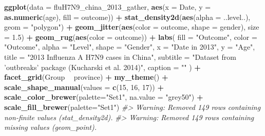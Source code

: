 \documentclass[]{book}
\newenvironment{Shaded}{\begin{snugshade}}{\end{snugshade}}
\newcommand{\CommentTok}[1]{\textcolor[rgb]{0.56,0.35,0.01}{\textit{#1}}}
\newcommand{\DataTypeTok}[1]{\textcolor[rgb]{0.13,0.29,0.53}{#1}}
\newcommand{\DecValTok}[1]{\textcolor[rgb]{0.00,0.00,0.81}{#1}}
\newcommand{\FloatTok}[1]{\textcolor[rgb]{0.00,0.00,0.81}{#1}}
\newcommand{\KeywordTok}[1]{\textcolor[rgb]{0.13,0.29,0.53}{\textbf{#1}}}
\newcommand{\NormalTok}[1]{#1}
\newcommand{\OperatorTok}[1]{\textcolor[rgb]{0.81,0.36,0.00}{\textbf{#1}}}
\newcommand{\StringTok}[1]{\textcolor[rgb]{0.31,0.60,0.02}{#1}}
\begin{document}
\begin{Shaded}
\begin{Highlighting}[]
\KeywordTok{ggplot}\NormalTok{(}\DataTypeTok{data =}\NormalTok{ fluH7N9_china_}\DecValTok{2013}\NormalTok{_gather, }
       \KeywordTok{aes}\NormalTok{(}\DataTypeTok{x =}\NormalTok{ Date, }\DataTypeTok{y =} \KeywordTok{as.numeric}\NormalTok{(age), }\DataTypeTok{fill =}\NormalTok{ outcome)) }\OperatorTok{+}
\StringTok{  }\KeywordTok{stat_density2d}\NormalTok{(}\KeywordTok{aes}\NormalTok{(}\DataTypeTok{alpha =}\NormalTok{ ..level..), }\DataTypeTok{geom =} \StringTok{"polygon"}\NormalTok{) }\OperatorTok{+}
\StringTok{  }\KeywordTok{geom_jitter}\NormalTok{(}\KeywordTok{aes}\NormalTok{(}\DataTypeTok{color =}\NormalTok{ outcome, }\DataTypeTok{shape =}\NormalTok{ gender), }\DataTypeTok{size =} \FloatTok{1.5}\NormalTok{) }\OperatorTok{+}
\StringTok{  }\KeywordTok{geom_rug}\NormalTok{(}\KeywordTok{aes}\NormalTok{(}\DataTypeTok{color =}\NormalTok{ outcome)) }\OperatorTok{+}
\StringTok{  }\KeywordTok{labs}\NormalTok{(}
    \DataTypeTok{fill =} \StringTok{"Outcome"}\NormalTok{,}
    \DataTypeTok{color =} \StringTok{"Outcome"}\NormalTok{,}
    \DataTypeTok{alpha =} \StringTok{"Level"}\NormalTok{,}
    \DataTypeTok{shape =} \StringTok{"Gender"}\NormalTok{,}
    \DataTypeTok{x =} \StringTok{"Date in 2013"}\NormalTok{,}
    \DataTypeTok{y =} \StringTok{"Age"}\NormalTok{,}
    \DataTypeTok{title =} \StringTok{"2013 Influenza A H7N9 cases in China"}\NormalTok{,}
    \DataTypeTok{subtitle =} \StringTok{"Dataset from 'outbreaks' package (Kucharski et al. 2014)"}\NormalTok{,}
    \DataTypeTok{caption =} \StringTok{""}
\NormalTok{  ) }\OperatorTok{+}
\StringTok{  }\KeywordTok{facet_grid}\NormalTok{(Group }\OperatorTok{~}\StringTok{ }\NormalTok{province) }\OperatorTok{+}
\StringTok{  }\KeywordTok{my_theme}\NormalTok{() }\OperatorTok{+}
\StringTok{  }\KeywordTok{scale_shape_manual}\NormalTok{(}\DataTypeTok{values =} \KeywordTok{c}\NormalTok{(}\DecValTok{15}\NormalTok{, }\DecValTok{16}\NormalTok{, }\DecValTok{17}\NormalTok{)) }\OperatorTok{+}
\StringTok{  }\KeywordTok{scale_color_brewer}\NormalTok{(}\DataTypeTok{palette=}\StringTok{"Set1"}\NormalTok{, }\DataTypeTok{na.value =} \StringTok{"grey50"}\NormalTok{) }\OperatorTok{+}
\StringTok{  }\KeywordTok{scale_fill_brewer}\NormalTok{(}\DataTypeTok{palette=}\StringTok{"Set1"}\NormalTok{)}
\CommentTok{#> Warning: Removed 149 rows containing non-finite values (stat_density2d).}
\CommentTok{#> Warning: Removed 149 rows containing missing values (geom_point).}
\end{Highlighting}
\end{Shaded}
\end{document}
